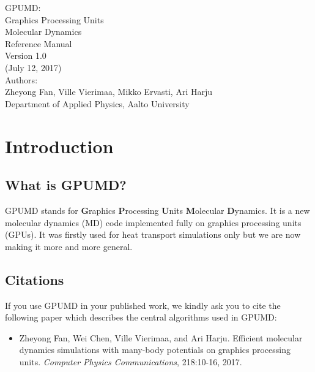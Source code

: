\documentclass[12pt,a4paper]{report}
\begin{document}
\begin{center}
  \huge
  {
   \vspace*{1.0cm}
   GPUMD: \\
   Graphics Processing Units \\
   Molecular Dynamics\\
   \vspace*{1.0cm}
   Reference Manual\\
   \vspace*{1.0cm}
   Version 1.0\\
   \vspace*{1.0cm}
   (July 12, 2017)\\
  \vspace*{2.0cm}
  }
  \large
  {
  Authors: \\
  Zheyong Fan,
  Ville Vierimaa,
  Mikko Ervasti,
  Ari Harju \\
  Department of Applied Physics, Aalto University
  }
  \vspace*{1.0cm}
\end{center}


\tableofcontents


\chapter{Introduction}


\section{What is GPUMD?}

GPUMD stands for \textbf{G}raphics \textbf{P}rocessing \textbf{U}nits \textbf{M}olecular \textbf{D}ynamics. It is a new molecular dynamics (MD) code implemented fully on graphics processing units (GPUs). It was firstly used for heat transport simulations only but we are now making it more and more general.


\section{Citations}

If you use GPUMD in your published work, we kindly ask you to cite the following paper which describes the central algorithms used in GPUMD:

\begin{itemize}
\item Zheyong Fan, Wei Chen, Ville Vierimaa, and Ari Harju. Efficient molecular
dynamics simulations with many-body potentials on graphics processing units.
\textit{Computer Physics Communications}, 218:10-16, 2017.
\end{itemize}
\end{document}
